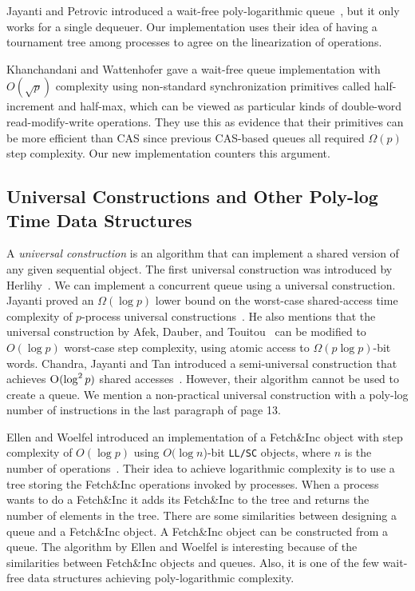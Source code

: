 Jayanti and Petrovic introduced a wait-free poly-logarithmic
queue~\cite{DBLP:conf/fsttcs/JayantiP05}, but it only works for a single dequeuer. 
Our implementation uses their idea of having
a tournament tree among processes to agree on the linearization of
operations.

Khanchandani and Wattenhofer \cite{KW18} gave a wait-free queue implementation
with $O(\sqrt{p})$ complexity using non-standard synchronization primitives
called half-increment and half-max, which can be viewed as particular kinds of
double-word read-modify-write operations.
They use this as evidence that their primitives can be more efficient than CAS
since previous CAS-based queues all required $\Omega(p)$ step complexity.
Our new implementation counters this argument.


\subsection{Universal Constructions and Other Poly-log Time Data Structures}
A \textit{universal construction} is an algorithm that can implement a
shared version of any given sequential object. The first universal
construction was introduced by
Herlihy~\cite{10.1145/114005.102808}. We can implement a concurrent
queue using a universal construction. Jayanti proved an $\Omega(\log
p)$ lower bound on the worst-case shared-access time complexity of
$p$-process universal
constructions~\cite{DBLP:conf/podc/Jayanti98a}. He also mentions that
the universal construction by Afek, Dauber, and
Touitou~\cite{DBLP:conf/stoc/AfekDT95} can be modified to $O(\log p)$
worst-case step complexity, using atomic access to $\Omega(p \log
p)$-bit words. Chandra, Jayanti and Tan introduced a semi-universal
construction that achieves $\textsc{O}(\log^2 p)$ shared
accesses~\cite{DBLP:conf/podc/ChandraJT98}. However, their algorithm
cannot be used to create a queue. We mention a non-practical universal
construction with a poly-log number of  instructions in the
last paragraph of page 13. 

Ellen and Woelfel introduced an implementation of a Fetch\&Inc object
with step complexity of $O(\log p)$ using $O(\log n$)-bit
\texttt{LL/SC} objects, where $n$ is the number of
operations~\cite{10.1007/978-3-642-41527-2_20}. Their idea to achieve
logarithmic complexity is to use a tree storing the Fetch\&Inc
operations invoked by processes. When a process wants to do a
Fetch\&Inc it adds its Fetch\&Inc to the tree and returns the number
of elements in the tree. There are some similarities between designing
a queue and a Fetch\&Inc object. A Fetch\&Inc object can be
constructed from a queue. The algorithm by Ellen and Woelfel is
interesting because of the similarities between Fetch\&Inc objects and
queues. Also, it is one of the few wait-free data structures achieving
poly-logarithmic complexity. 

